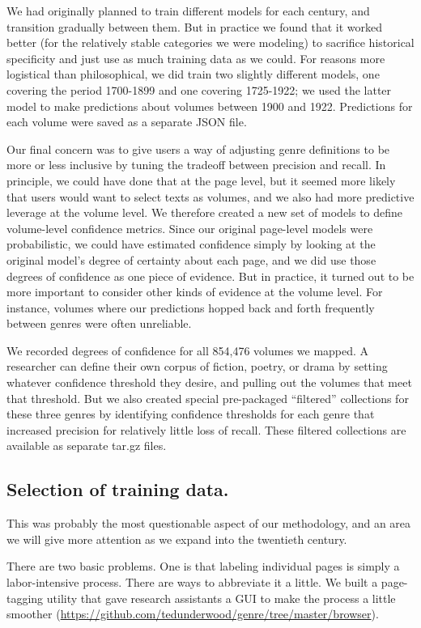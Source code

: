 \documentclass[paper=a4, fontsize=12pt]{scrartcl}
\numberwithin{equation}{section}		%
\numberwithin{figure}{section}			%
\numberwithin{table}{section}				%
\begin{document}
We had originally planned to train different models for each century, and transition gradually between them. But in practice we found that it worked better (for the relatively stable categories we were modeling) to sacrifice historical specificity and just use as much training data as we could. For reasons more logistical than philosophical, we did train two slightly different models, one covering the period 1700-1899 and one covering 1725-1922; we used the latter model to make predictions about volumes between 1900 and 1922. Predictions for each volume were saved as a separate JSON file.

Our final concern was to give users a way of adjusting genre definitions to be more or less inclusive by tuning the tradeoff between precision and recall. In principle, we could have done that at the page level, but it seemed more likely that users would want to select texts as volumes, and we also had more predictive leverage at the volume level. We therefore created a new set of models to define volume-level confidence metrics. Since our original page-level models were probabilistic, we could have estimated confidence simply by looking at the original model's degree of certainty about each page, and we did use those degrees of confidence as one piece of evidence. But in practice, it turned out to be more important to consider other kinds of evidence at the volume level. For instance, volumes where our predictions hopped back and forth frequently between genres were often unreliable.

We recorded degrees of confidence for all 854,476 volumes we mapped. A researcher can define their own corpus of fiction, poetry, or drama by setting whatever confidence threshold they desire, and pulling out the volumes that meet that threshold. But we also created special pre-packaged ``filtered'' collections for these three genres by identifying confidence thresholds for each genre that increased precision for relatively little loss of recall. These filtered collections are available as separate tar.gz files.

\subsection{Selection of training data.}

This was probably the most questionable aspect of our methodology, and an area we will give more attention as we expand into the twentieth century.

There are two basic problems. One is that labeling individual pages is simply a labor-intensive process. There are ways to abbreviate it a little. We built a page-tagging utility that gave research assistants a GUI to make the process a little smoother (\url{https://github.com/tedunderwood/genre/tree/master/browser}).
\end{document}
